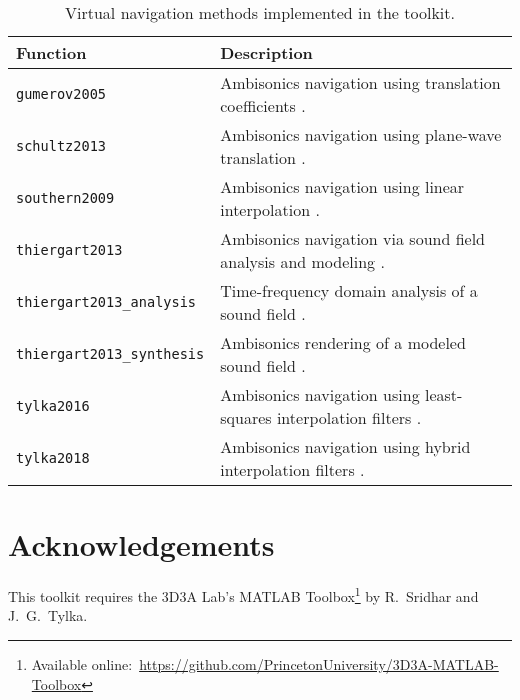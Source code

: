 \documentclass[11pt, oneside]{article}
\begin{document}
\begin{table}
\centering
  \begin{tabular}{| l | p{11cm} |}
    \hline
    \textbf{Function} & \textbf{Description} \\ \hline
    \texttt{gumerov2005} & Ambisonics navigation using translation coefficients \citep{GumerovDuraiswami2005,Zotter2009PhD}. \\ \hline
    \texttt{schultz2013} & Ambisonics navigation using plane-wave translation \citep{SchultzSpors2013}. \\ \hline
    \texttt{southern2009} & Ambisonics navigation using linear interpolation \citep{Southern2009}. \\ \hline
    \texttt{thiergart2013} & Ambisonics navigation via sound field analysis and modeling \citep{Thiergart2013}. \\ \hline
    \texttt{thiergart2013\_analysis} & Time-frequency domain analysis of a sound field \citep{Thiergart2013}. \\ \hline
    \texttt{thiergart2013\_synthesis} & Ambisonics rendering of a modeled sound field \citep{Thiergart2013}. \\ \hline
    \texttt{tylka2016} & Ambisonics navigation using least-squares interpolation filters \citep{TylkaChoueiri2016}. \\ \hline
    \texttt{tylka2018} & Ambisonics navigation using hybrid interpolation filters \citep{TylkaChoueiri2018}. \\ \hline
    \end{tabular}
    \caption{Virtual navigation methods implemented in the toolkit.}
    \label{tab:Methods}
\end{table}

\section*{Acknowledgements}
This toolkit requires the 3D3A Lab's MATLAB Toolbox\footnote{Available online:~\url{https://github.com/PrincetonUniversity/3D3A-MATLAB-Toolbox}}
by R.~Sridhar and J.~G.~Tylka.



\end{document}
